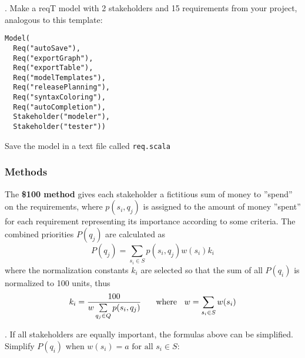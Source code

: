 \documentclass[11pt]{article}
\begin{document}
  \begin{framed}
 . Make a reqT model with 2 stakeholders and 15 requirements from your project, analogous to this template: 
 
\begin{lstlisting}
Model(
  Req("autoSave"),
  Req("exportGraph"), 
  Req("exportTable"), 
  Req("modelTemplates"), 
  Req("releasePlanning"), 
  Req("syntaxColoring"), 
  Req("autoCompletion"), 
  Stakeholder("modeler"),
  Stakeholder("tester"))     
\end{lstlisting}
Save the model in a text file called \verb+req.scala+
\end{framed}
 
\subsubsection{Methods}

\noindent The {\bf \$100 method} gives each stakeholder a fictitious sum of money to ''spend'' on the requirements, where $p(s_i, q_j)$ is assigned to the amount of money ''spent'' for each requirement representing its importance according to some criteria. The combined priorities $P(q_j)$ are calculated as  
\begin{displaymath}
P(q_j) = \sum\limits_{s_i \in S} p(s_i, q_j) w(s_i) k_i
\end{displaymath}
where the normalization constants $k_i$ are selected so that the sum of all $P(q_i)$ is normalized to 100 units, thus 
\begin{displaymath}
k_i = \frac{100}{   w \sum\limits_{q_j \in Q} p(s_i, q_j)} \text{ \hspace{4mm} where \hspace{2mm}}
w = \sum\limits_{s_i \in S} w(s_i)
\end{displaymath} 

\begin{framed}
. If all stakeholders are equally important, the formulas above can be simplified. Simplify $P(q_i)$ when $w(s_i) = a \text{ for all  } s_i \in S$: \newline\newline\newline\newline    \underline{\hspace{11cm}}
 \end{framed}
\end{document}
